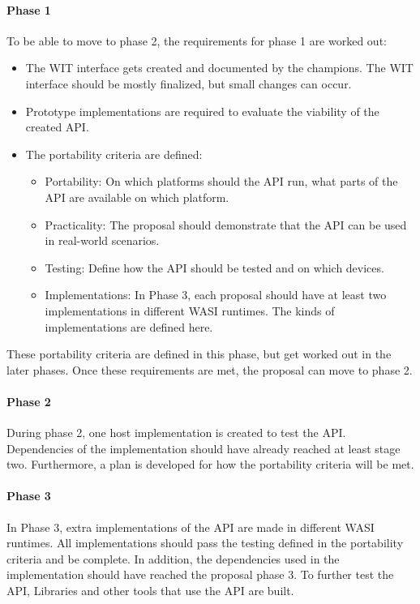 \paragraph{Phase 1}
To be able to move to phase 2, the requirements for phase 1 are worked out:
\begin{itemize}
\item The \acrshort{WIT} interface gets created and documented by the champions. The \acrshort{WIT} interface should be mostly finalized, but small changes can occur.
\item Prototype implementations are required to evaluate the viability of the created \acrshort{API}.
\item The portability criteria are defined:
\begin{itemize}
\item Portability: On which platforms should the \acrshort{API} run, what parts of the \acrshort{API} are available on which platform.
\item Practicality: The proposal should demonstrate that the \acrshort{API} can be used in real-world scenarios.
\item Testing: Define how the \acrshort{API} should be tested and on which devices.
\item Implementations: In Phase 3, each proposal should have at least two implementations in different \acrshort{WASI} runtimes. The kinds of implementations are defined here.
\end{itemize}
\end{itemize}

These portability criteria are defined in this phase, but get worked out in the later phases.
Once these requirements are met, the proposal can move to phase 2.

\paragraph{Phase 2}
During phase 2, one host implementation is created to test the \acrshort{API}. Dependencies of the implementation should have already reached at least stage two.
Furthermore, a plan is developed for how the portability criteria will be met.

\paragraph{Phase 3}
In Phase 3, extra implementations of the \acrshort{API} are made in different \acrshort{WASI} runtimes. All implementations should pass the testing defined in the portability criteria and be complete. In addition, the dependencies used in the implementation should have reached the proposal phase 3. To further test the \acrshort{API}, Libraries and other tools that use the \acrshort{API} are built.

